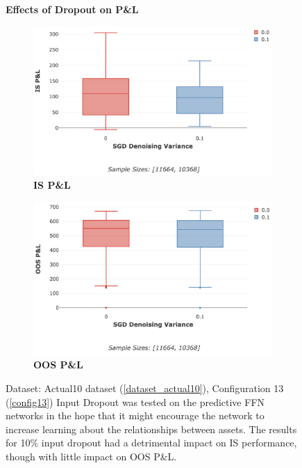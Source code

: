 \documentclass[a4paper,11pt,oneside]{article}
\theoremstyle{plain}
\theoremstyle{definition}
\begin{document}
	\begin{figure}[H]
		\centering
		\textbf{Effects of Dropout on P\&L}
				\begin{subfigure}{.5\textwidth}
			\centering 
			\includegraphics[scale=0.305]{images/results/8_6_complexity/is_actual_pl_masking.png}
			\caption{\textbf{IS P\&L} }
			\label{figure-is_actual_pl_masking}
		\end{subfigure}%
		\begin{subfigure}{.5\textwidth}
			\centering 
			\includegraphics[scale=0.3]{images/results/8_6_complexity/oos_actual_pl_masking.png}
			\caption{\textbf{OOS P\&L} }
			\label{figure-oos_actual_pl_masking}
		\end{subfigure}
		\caption[Effects of Dropout on P\&L]{Dataset: Actual10 dataset (\ref{dataset_actual10}), Configuration 13 (\ref{config13})
			\newline Input Dropout was tested on the predictive FFN networks in the hope that it might encourage the network to increase learning about the relationships between assets. The results for 10\% input dropout had a detrimental impact on IS performance, though with little impact on OOS P\&L.}
		\label{figure-actual_pl_masking}
	\end{figure}
		
\end{document}
